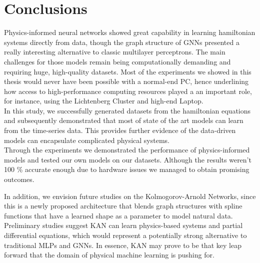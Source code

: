 \chapter{Conclusions}
Physics-informed neural networks showed great capability in learning hamiltonian systems directly from data, though the graph structure of GNNs presented a really interesting alternative to classic multilayer perceptrons. The main challenges for those models remain being computationally demanding and requiring huge, high-quality datasets. Most of the experiments we showed in this thesis would never have been possible with a normal-end PC, hence underlining how access to high-performance computing resources played a an important role, for instance, using the Lichtenberg Cluster and high-end Laptop.\\
In this study, we successfully generated datasets from the hamiltonian equations and subsequently demonstrated that most of state of the art models  can learn from the time-series data. This provides further evidence of the  data-driven models can encapsulate complicated physical systems.\\
Through the experiments we demonstrated the performance of physics-informed models and  tested our own models on our datasets. Although the results weren't 100 \% accurate enough due to hardware issues we managed to obtain promising outcomes.  

In addition, we envision future studies on the Kolmogorov-Arnold Networks, since this is a newly proposed architecture that blends graph structures with spline functions that have a learned shape as a parameter to model natural data. Preliminary studies suggest KAN can learn physics-based systems and partial differential equations, which would represent a potentially strong alternative to traditional MLPs and GNNs\cite{kan}. In essence, KAN may prove to be that key leap forward that the domain of physical machine learning is pushing for.
   